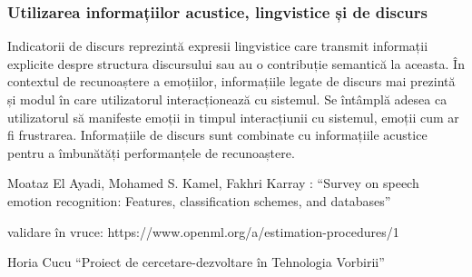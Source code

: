 \documentclass[9pt,shortpaper,twoside,web]{ieeecolor}
\begin{document}
\subsubsection{Utilizarea informațiilor acustice, lingvistice și de discurs}
Indicatorii de discurs reprezintă expresii lingvistice care transmit informații explicite despre structura discursului sau au o contribuție semantică la aceasta. În contextul de recunoaștere a emoțiilor, informațiile legate de discurs mai prezintă și modul în care utilizatorul interacționează cu sistemul. Se întâmplă adesea ca utilizatorul să manifeste emoții in timpul interacțiunii cu sistemul, emoții cum ar fi frustrarea. Informațiile de discurs sunt combinate cu informațiile acustice pentru a îmbunătăți performanțele de recunoaștere.













\begin{thebibliography}{00}

 Moataz El Ayadi, Mohamed S. Kamel, Fakhri Karray : ``Survey on speech emotion recognition: Features, classification schemes, and databases''

 validare în vruce: https://www.openml.org/a/estimation-procedures/1

 Horia Cucu ``Proiect de cercetare-dezvoltare în Tehnologia Vorbirii''

\end{thebibliography}
\end{document}
